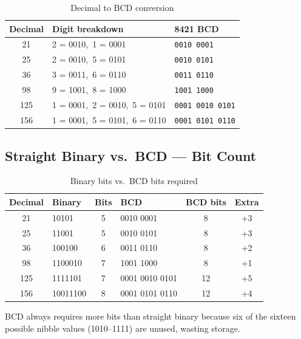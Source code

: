\documentclass[12pt,a4paper]{article}
\begin{document}
\begin{table}[H]
\centering
\caption{Decimal to BCD conversion}
\begin{tabular}{|c|l|l|}
\hline
\textbf{Decimal} & \textbf{Digit breakdown} & \textbf{8421 BCD} \\
\hline
21  & 2 = 0010,\ 1 = 0001                       & \texttt{0010 0001} \\
\hline
25  & 2 = 0010,\ 5 = 0101                       & \texttt{0010 0101} \\
\hline
36  & 3 = 0011,\ 6 = 0110                       & \texttt{0011 0110} \\
\hline
98  & 9 = 1001,\ 8 = 1000                       & \texttt{1001 1000} \\
\hline
125 & 1 = 0001,\ 2 = 0010,\ 5 = 0101           & \texttt{0001 0010 0101} \\
\hline
156 & 1 = 0001,\ 5 = 0101,\ 6 = 0110           & \texttt{0001 0101 0110} \\
\hline
\end{tabular}
\end{table}

\subsection{Straight Binary vs.\ BCD --- Bit Count}

\begin{table}[H]
\centering
\caption{Binary bits vs.\ BCD bits required}
\small
\begin{tabular}{|c|l|c|l|c|c|}
\hline
\textbf{Decimal} & \textbf{Binary} & \textbf{Bits} & \textbf{BCD} & \textbf{BCD bits} & \textbf{Extra} \\
\hline
21  & 10101     & 5 & 0010 0001        & 8  & +3 \\
\hline
25  & 11001     & 5 & 0010 0101        & 8  & +3 \\
\hline
36  & 100100    & 6 & 0011 0110        & 8  & +2 \\
\hline
98  & 1100010   & 7 & 1001 1000        & 8  & +1 \\
\hline
125 & 1111101   & 7 & 0001 0010 0101   & 12 & +5 \\
\hline
156 & 10011100  & 8 & 0001 0101 0110   & 12 & +4 \\
\hline
\end{tabular}
\end{table}

BCD always requires more bits than straight binary because six of the sixteen possible
nibble values (1010--1111) are unused, wasting storage.
\end{document}
